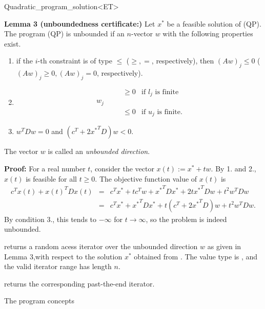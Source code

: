 \begin{ccRefClass}{Quadratic_program_solution<ET>}
\begin{ccAdvanced}
{\bf Lemma 3 (unboundedness certificate:)} Let $x^*$ be a feasible
solution of (QP). The program (QP) is unbounded if an $n$-vector 
$w$ with the following properties exist.
\begin{enumerate}
\item if the $i$-th constraint is of type $\leq$ ($\geq, =$, respectively),
then $(Aw)_j\leq 0$ ($(Aw)_j\geq 0, (Aw)_j=0$, respectively).
\item 
\[
\begin{array}{llll}
&&\geq 0 & \mbox{if $l_j$ is finite} \\
w_j &\quad  \\
&&\leq 0 & \mbox{if $u_j$ is finite.}
\end{array}
\]
\item $w^TDw=0$ and $(c^T+2{x^*}^TD)w<0$.
\end{enumerate}

The vector $w$ is called an \emph{unbounded direction}.

{\bf Proof:} For a real number $t$, consider the vector $x(t):=x^*+tw$. By 1.
and 2., $x(t)$ is feasible for all $t\geq 0$. The objective function value
of $x(t)$ is
\begin{eqnarray*}
c^T x(t) + x(t)^TD x(t) &=& 
c^Tx^* + tc^Tw + {x^*}^TDx^* +  2t{x^*}^TDw + t^2 w^TDw  \\
&=& c^Tx^* + {x^*}^TDx^* + t(c^T + 2{x^*}^TD)w + t^2w^TDw.
\end{eqnarray*}
By condition 3., this tends to $-\infty$ for $t\rightarrow\infty$, so
the problem is indeed unbounded. 

{returns a random acess iterator over the unbounded direction $w$
as given in Lemma 3,with respect to the solution $x^*$ 
obtained from \ccVar{}. The value type
is , and the valid iterator range has length $n$.
\ccPrecond \ccVar{}}

{returns the corresponding past-the-end iterator.}
\ccExample
{}

\end{ccAdvanced}

\ccSeeAlso

The program concepts 

\\
\\
\\


\end{ccRefClass}
